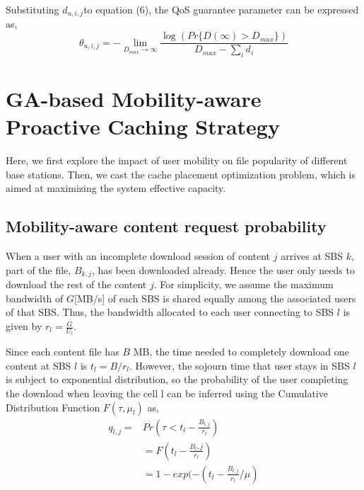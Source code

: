 \documentclass[conference]{IEEEtran}
\begin{document}
Substituting $d_{u,i,j}$to equation (6), the QoS guarantee parameter can be expressed as,
\begin{equation}
\theta_{u,i,j}=-\lim_{D_{max}\to \infty}\frac{\log(Pr\{D(\infty)>D_{max}\})}{D_{max}-\sum_i d_i}
\end{equation}

\section{GA-based Mobility-aware Proactive Caching Strategy}
Here, we first explore the impact of user mobility on file popularity of different base stations. Then, we cast the cache placement optimization problem, which is aimed at maximizing the system effective capacity.
\subsection{Mobility-aware content request probability}
When a user with an incomplete download session of content $j$ arrives at SBS $k$, part of the file, $B_{k,j}$, has been downloaded already. Hence the user only needs to download the rest of the content $j$. For simplicity, we assume the maximum bandwidth of $G$[MB/s] of each SBS is shared equally among the associated users of that SBS\cite{8108779}. Thus, the bandwidth allocated to each user connecting to SBS $l$ is given by $r_l=\frac{G}{U_l}$.

Since each content file has $B$ MB, the time needed to completely download one content at SBS $l$ is $t_l=B/r_l$.
However, the sojourn time that user stays in SBS $l$ is subject to exponential distribution, so the probability of the user completing the download when leaving the cell l can be inferred using the Cumulative Distribution Function $F(\tau,\mu_l)$ as,
\begin{equation}
  \begin{aligned}
 q_{l,j}=& Pr(\tau<t_l-\frac{B_{l,j}}{r_l})\\
  &=F(t_l-\frac{B_l,j}{r_l})\\
  &=1-exp(-(t_l-\frac{B_{l,j}}{r_l}/\mu)
  \end{aligned}
\end{equation}
\end{document}
